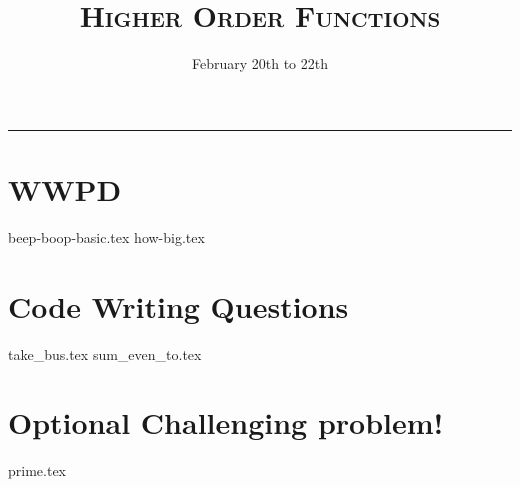 \documentclass{exam}
\title{\textsc{Higher Order Functions}}
\date{February 20th to 22th}
\begin{document}
\maketitle
\rule{\textwidth}{0.15em}
\fontsize{12}{15}\selectfont


\section{WWPD}
\begin{questions}
{beep-boop-basic.tex}
\newpage
{how-big.tex}
\end{questions}

\newpage
\section{Code Writing Questions}
\begin{questions}
{take_bus.tex}
{sum_even_to.tex}
\newpage
\section{Optional Challenging problem!}
{prime.tex}

\end{questions}
\end{document}
